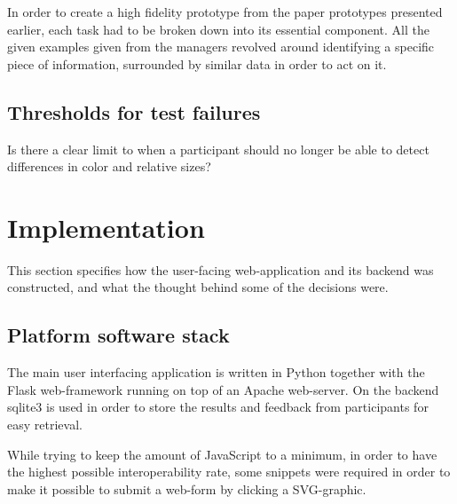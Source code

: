 \documentclass[nofilelist,dvipsnames]{cslthse-msc}
\begin{document}
        In order to create a high fidelity prototype from the paper prototypes
        presented earlier, each task had to be broken down into its essential
        component. All the given examples given from the managers revolved
        around identifying a specific piece of information, surrounded by
        similar data in order to act on it.



%
%

			\subsection{Thresholds for test failures}

        Is there a clear limit to when a participant should no longer be able
        to detect differences in color and relative sizes?



		\section{Implementation}

      This section specifies how the user-facing web-application and its
      backend was constructed, and what the thought behind some of the
      decisions were.


			\subsection{Platform software stack}

        The main user interfacing application is written in Python together
        with the Flask web-framework running on top of an Apache web-server.
        On the backend sqlite3 is used in order to store the results and
        feedback from participants for easy retrieval.

        While trying to keep the amount of JavaScript to a minimum, in order to
        have the highest possible interoperability rate, some snippets were
        required in order to make it possible to submit a web-form by clicking
        a SVG-graphic.
\end{document}
